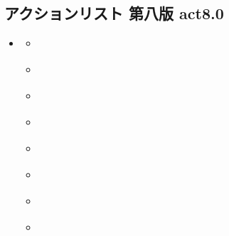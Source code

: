 \documentclass[letterpaper,10pt,dvipdfmx]{sphinxmanual}
\begin{document}
\subsection{アクションリスト 第八版 act8.0}
\label{\detokenize{auto/actionlist:act8-0}}\label{\detokenize{auto/actionlist:act-act}}\label{\detokenize{auto/actionlist::doc}}
\begin{sphinxShadowBox}
\begin{itemize}
\item {} 
\sphinxAtStartPar
{}\label{\detokenize{auto/actionlist:id58}}{\hyperref[\detokenize{auto/actionlist:id2}]{}}
\begin{itemize}
\item {} 
\sphinxAtStartPar
{}\label{\detokenize{auto/actionlist:id59}}{\hyperref[\detokenize{auto/actionlist:act-setbulwark}]{}}

\item {} 
\sphinxAtStartPar
{}\label{\detokenize{auto/actionlist:id60}}{\hyperref[\detokenize{auto/actionlist:act-summonssoldier}]{}}

\item {} 
\sphinxAtStartPar
{}\label{\detokenize{auto/actionlist:id61}}{\hyperref[\detokenize{auto/actionlist:act-summonshero}]{}}

\item {} 
\sphinxAtStartPar
{}\label{\detokenize{auto/actionlist:id62}}{\hyperref[\detokenize{auto/actionlist:act-summonsace}]{}}

\item {} 
\sphinxAtStartPar
{}\label{\detokenize{auto/actionlist:id63}}{\hyperref[\detokenize{auto/actionlist:act-quicksummonsace}]{}}

\item {} 
\sphinxAtStartPar
{}\label{\detokenize{auto/actionlist:id64}}{\hyperref[\detokenize{auto/actionlist:act-summonsmagic}]{}}

\item {} 
\sphinxAtStartPar
{}\label{\detokenize{auto/actionlist:id65}}{\hyperref[\detokenize{auto/actionlist:act-mountsoldier}]{}}

\item {} 
\sphinxAtStartPar
{}\label{\detokenize{auto/actionlist:id66}}{\hyperref[\detokenize{auto/actionlist:act-unsummons}]{}}


\end{itemize}
\end{itemize}
\end{sphinxShadowBox}
\end{document}
